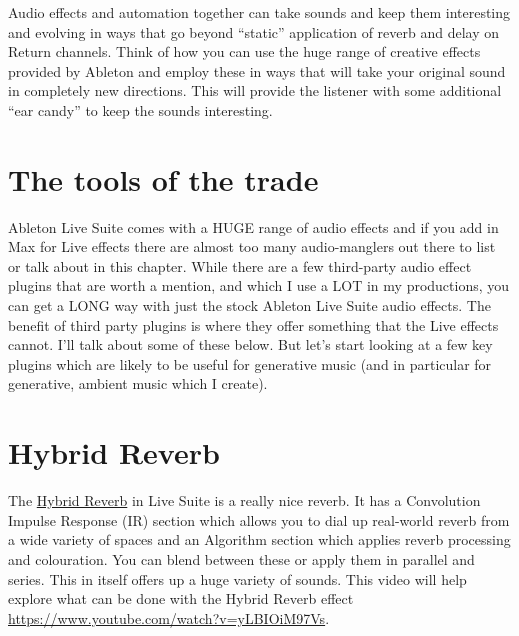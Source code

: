\documentclass[
  12pt,
  letterpaper,
  oneside,
  open=any]{scrbook}
\begin{document}
\begin{tcolorbox}[enhanced jigsaw, opacitybacktitle=0.6, rightrule=.15mm, leftrule=.75mm, opacityback=0, toptitle=1mm, toprule=.15mm, breakable, titlerule=0mm, colback=white, bottomtitle=1mm, title=\textcolor{quarto-callout-tip-color}{\faLightbulb}\hspace{0.5em}{Key idea}, coltitle=black, left=2mm, colframe=quarto-callout-tip-color-frame, bottomrule=.15mm, colbacktitle=quarto-callout-tip-color!10!white, arc=.35mm]

Audio effects and automation together can take sounds and keep them
interesting and evolving in ways that go beyond ``static'' application
of reverb and delay on Return channels. Think of how you can use the
huge range of creative effects provided by Ableton and employ these in
ways that will take your original sound in completely new directions.
This will provide the listener with some additional ``ear candy'' to
keep the sounds interesting.

\end{tcolorbox}

\section{The tools of the trade}\label{the-tools-of-the-trade}

Ableton Live Suite comes with a HUGE range of audio effects and if you
add in Max for Live effects there are almost too many audio-manglers out
there to list or talk about in this chapter. While there are a few
third-party audio effect plugins that are worth a mention, and which I
use a LOT in my productions, you can get a LONG way with just the stock
Ableton Live Suite audio effects. The benefit of third party plugins is
where they offer something that the Live effects cannot. I'll talk about
some of these below. But let's start looking at a few key plugins which
are likely to be useful for generative music (and in particular for
generative, ambient music which I create).

\section{Hybrid Reverb}\label{hybrid-reverb}

The
\href{https://www.ableton.com/en/live-manual/11/live-audio-effect-reference/\#hybrid-reverb}{Hybrid
Reverb} in Live Suite is a really nice reverb. It has a Convolution
Impulse Response (IR) section which allows you to dial up real-world
reverb from a wide variety of spaces and an Algorithm section which
applies reverb processing and colouration. You can blend between these
or apply them in parallel and series. This in itself offers up a huge
variety of sounds. This video will help explore what can be done with
the Hybrid Reverb effect
\url{https://www.youtube.com/watch?v=yLBIOiM97Vs}.
\end{document}
